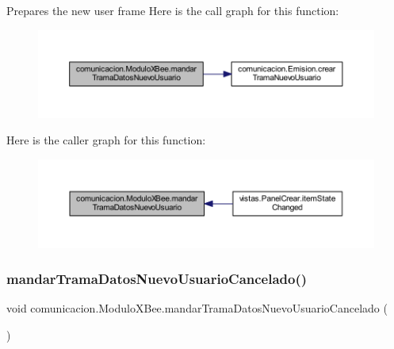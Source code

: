 Prepares the new user frame Here is the call graph for this function\+:
\nopagebreak
\begin{figure}[H]
\begin{center}
\leavevmode
\includegraphics[width=350pt]{classcomunicacion_1_1_modulo_x_bee_aecb573d973ba1e5e24a2c2cc5d1541f6_cgraph}
\end{center}
\end{figure}
Here is the caller graph for this function\+:
\nopagebreak
\begin{figure}[H]
\begin{center}
\leavevmode
\includegraphics[width=350pt]{classcomunicacion_1_1_modulo_x_bee_aecb573d973ba1e5e24a2c2cc5d1541f6_icgraph}
\end{center}
\end{figure}
\mbox{\label{classcomunicacion_1_1_modulo_x_bee_a965cdd2756d507c8c80eade0bf34d06e}} 
\subsubsection{\texorpdfstring{mandar\+Trama\+Datos\+Nuevo\+Usuario\+Cancelado()}{mandarTramaDatosNuevoUsuarioCancelado()}}
{\footnotesize\ttfamily void comunicacion.\+Modulo\+X\+Bee.\+mandar\+Trama\+Datos\+Nuevo\+Usuario\+Cancelado (\begin{DoxyParamCaption}{ }\end{DoxyParamCaption})}


